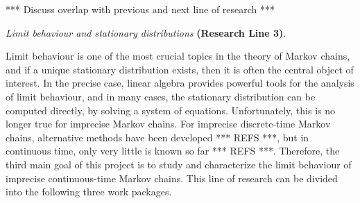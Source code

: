 \documentclass[11pt,dvipsnames,usenames,a4paper]{article}
\begin{document}
*** Discuss overlap with previous and next line of research ***

\vspace{8pt}
\emph{Limit behaviour and stationary distributions} {\bf (Research Line 3)}.
\vspace{3pt}

Limit behaviour is one of the most crucial topics in the theory of Markov chains, and if a unique stationary distribution exists, then it is often the central object of interest. In the precise case, linear algebra provides powerful tools for the analysis of limit behaviour, and in many cases, the stationary distribution can be computed directly, by solving a system of equations. Unfortunately, this is no longer true for imprecise Markov chains. For imprecise discrete-time Markov chains, alternative methods have been developed *** REFS ***, but in continuous time, only very little is known so far *** REFS ***. Therefore, the third main goal of this project is to study and characterize the limit behaviour of imprecise continuous-time Markov chains. This line of research can be divided into the following three work packages.
\end{document}
